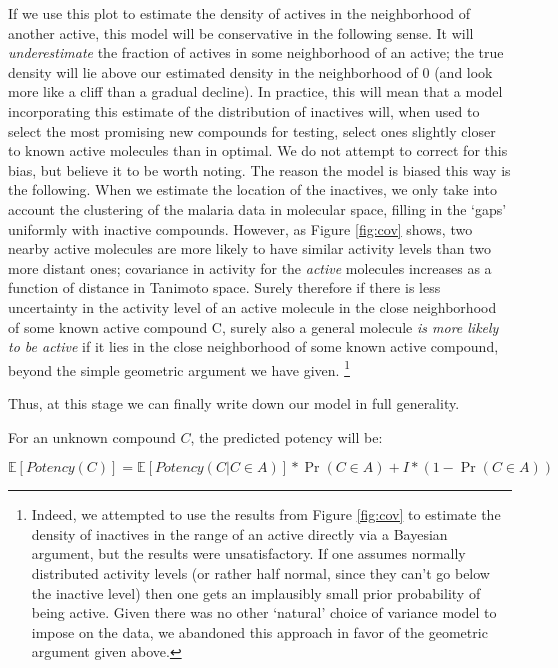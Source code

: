 \documentclass{article}
\begin{document}
If we use this plot to estimate the density of actives in the neighborhood of another active, this model will be conservative in the following sense.  It will \textit{underestimate} the fraction of actives in some neighborhood of an active; the true density will lie above our estimated density in the neighborhood of 0 (and look more like a cliff than a gradual decline).  In practice, this will mean that a model incorporating this estimate of the distribution of inactives will, when used to select the most promising new compounds for testing, select ones slightly closer to known active molecules than in optimal. We do not attempt to correct for this bias, but believe it to be worth noting. The reason the model is biased this way is the following. When we estimate the location of the inactives, we only take into account the clustering of the malaria data in molecular space, filling in the `gaps' uniformly with inactive compounds.  However, as Figure \ref{fig:cov} shows, two nearby active molecules are more likely to have similar activity levels than two more distant ones; covariance in activity for the \textit{active} molecules increases as a function of distance in Tanimoto space.  Surely therefore if there is less uncertainty in the activity level of an active molecule in the close neighborhood of some known active compound C, surely also a general molecule \textit{is more likely to be active} if it lies in the close neighborhood of some known active compound, beyond the simple geometric argument we have given. \footnote{Indeed, we attempted to use the results from Figure \ref{fig:cov} to estimate the density of inactives in the range of an active directly via a Bayesian argument, but the results were unsatisfactory.  If one assumes normally distributed activity levels (or rather half normal, since they can't go below the inactive level) then one gets an implausibly small prior probability of being active.  Given there was no other `natural' choice of variance model to impose on the data, we abandoned this approach in favor of the geometric argument given above.}
\newline
\newline

Thus, at this stage we can finally write down our model in full generality.

For an unknown compound $C$, the predicted potency will be:

\begin{equation}
    \mathbb{E}[Potency(C)] = \mathbb{E}[Potency(C | C \in A)] * \Pr(C \in A) + I * (1-\Pr(C \in A))   
\end{equation}
\end{document}
